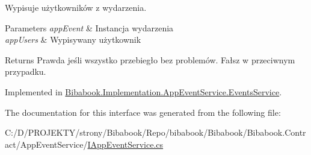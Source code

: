 Wypisuje użytkowników z wydarzenia. 


\begin{DoxyParams}{Parameters}
{\em app\+Event} & Instancja wydarzenia\\
\hline
{\em app\+Users} & Wypisywany użytkownik\\
\hline
\end{DoxyParams}
\begin{DoxyReturn}{Returns}
Prawda jeśli wszystko przebiegło bez problemów. Fałsz w przeciwnym przypadku.
\end{DoxyReturn}


Implemented in \hyperlink{class_bibabook_1_1_implementation_1_1_app_event_service_1_1_events_service_a425edae1da002dcceeebd6bf65c316b0}{Bibabook.\+Implementation.\+App\+Event\+Service.\+Events\+Service}.



The documentation for this interface was generated from the following file\+:\begin{DoxyCompactItemize}
\item 
C\+:/\+D/\+P\+R\+O\+J\+E\+K\+T\+Y/strony/\+Bibabook/\+Repo/bibabook/\+Bibabook/\+Bibabook.\+Contract/\+App\+Event\+Service/\hyperlink{_i_app_event_service_8cs}{I\+App\+Event\+Service.\+cs}\end{DoxyCompactItemize}

